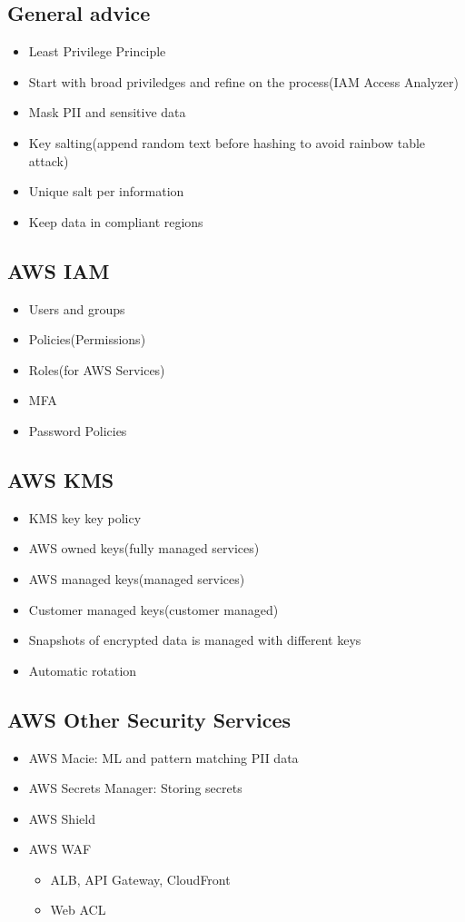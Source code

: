 \documentclass[../../main.tex]{subfiles}
\begin{document}
\subsection{General advice}
\begin{itemize}
    \item Least Privilege Principle
    \item Start with broad priviledges and refine on the process(IAM Access Analyzer)
    \item Mask PII and sensitive data
    \item Key salting(append random text before hashing to avoid rainbow table attack)
    \item Unique salt per information
    \item Keep data in compliant regions
\end{itemize}

\subsection{AWS IAM}
\begin{itemize}
    \item Users and groups
    \item Policies(Permissions)
    \item Roles(for AWS Services)
    \item MFA
    \item Password Policies
\end{itemize}

\subsection{AWS KMS}
\begin{itemize}
    \item KMS key key policy
    \item AWS owned keys(fully managed services)
    \item AWS managed keys(managed services)
    \item Customer managed keys(customer managed)
    \item Snapshots of encrypted data is managed with different keys
    \item Automatic rotation
\end{itemize}

\subsection{AWS Other Security Services}
\begin{itemize}
    \item AWS Macie: ML and pattern matching PII data
    \item AWS Secrets Manager: Storing secrets
    \item AWS Shield
    \item AWS WAF
    \begin{itemize}
        \item ALB, API Gateway, CloudFront
        \item Web ACL
    \end{itemize}
\end{itemize}
\end{document}
